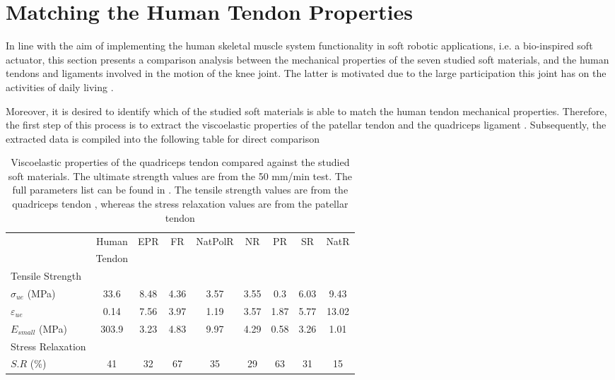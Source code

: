 \section{Matching the Human Tendon Properties}

In line with the aim of implementing the human skeletal muscle system functionality in soft robotic applications, i.e. a bio-inspired soft actuator, this section presents a comparison analysis between the mechanical properties of the seven studied soft materials, and the human tendons and ligaments involved in the motion of the knee joint. The latter is motivated due to the large participation this joint has on the activities of daily living . 

Moreover, it is desired to identify which of the studied soft materials is able to match the human tendon mechanical properties. Therefore, the first step of this process is to extract the viscoelastic properties of the patellar tendon and the quadriceps ligament \cite{schatzmann1998effect,staubli1999mechanical,johnson1994tensile}. Subsequently, the extracted data is compiled into the following table for direct comparison

\begin{table}[htbp!]
    \centering
    \caption{Viscoelastic properties of the quadriceps tendon compared against the studied soft materials. The ultimate strength values are from the 50 mm/min test. The full parameters list can be found in . The tensile strength values are from the quadriceps tendon \cite{schatzmann1998effect}, whereas the stress relaxation values are from the patellar tendon \cite{johnson1994tensile}}
    \begin{tabular}{lcccccccc}
    \toprule
    & Human & EPR & FR & NatPolR & NR & PR & SR & NatR \\
    & Tendon \\
    \hline
    Tensile Strength \\
    \hline
    $\sigma_{ue}$ (MPa)     & 33.6   & 8.48 & 4.36  & 3.57  & 3.55  & 0.3   & 6.03  & 9.43  \\
    $\varepsilon_{ue}$      & 0.14   & 7.56 & 3.97  & 1.19  & 3.57  & 1.87  & 5.77  & 13.02  \\
    $E_{small}$ (MPa)   & 303.9  & 3.23 & 4.83  & 9.97  & 4.29  & 0.58  & 3.26  & 1.01  \\
    \midrule
    Stress Relaxation  \\
    \hline
    $S.R$ (\%)                          & 41     & 32    & 67   & 35    & 29    & 63    & 31    & 15\\
    \bottomrule
    \end{tabular}
    \label{tbl:tendon&soft}
\end{table}

